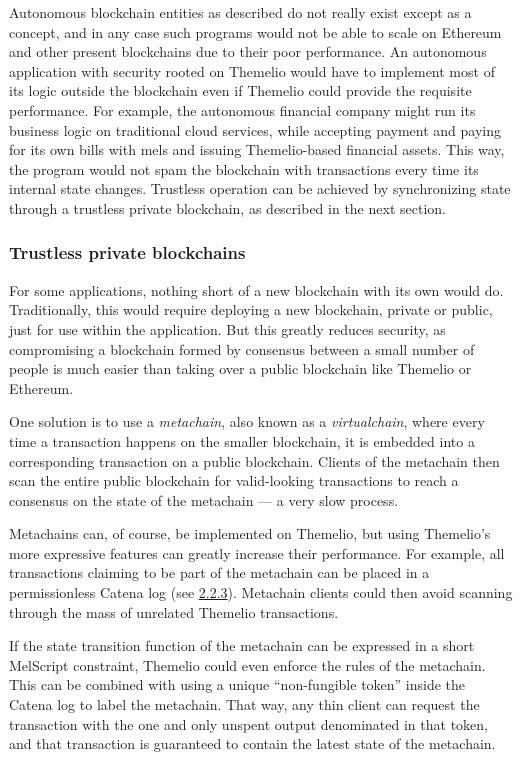 \documentclass[]{article}
\begin{document}
Autonomous blockchain entities as described do not really exist except
as a concept, and in any case such programs would not be able to scale
on Ethereum and other present blockchains due to their poor performance.
An autonomous application with security rooted on Themelio would have to
implement most of its logic outside the blockchain even if Themelio
could provide the requisite performance. For example, the autonomous
financial company might run its business logic on traditional cloud
services, while accepting payment and paying for its own bills with mels
and issuing Themelio-based financial assets. This way, the program would
not spam the blockchain with transactions every time its internal state
changes. Trustless operation can be achieved by synchronizing state
through a trustless private blockchain, as described in the next
section.

\hypertarget{trustless-private-blockchains}{%
\subsubsection{Trustless private
blockchains}\label{trustless-private-blockchains}}

For some applications, nothing short of a new blockchain with its own
would do. Traditionally, this would require deploying a new blockchain,
private or public, just for use within the application. But this greatly
reduces security, as compromising a blockchain formed by consensus
between a small number of people is much easier than taking over a
public blockchain like Themelio or Ethereum.

One solution is to use a \emph{metachain}, also known as a
\emph{virtualchain}, where every time a transaction happens on the
smaller blockchain, it is embedded into a corresponding transaction on a
public blockchain. Clients of the metachain then scan the entire public
blockchain for valid-looking transactions to reach a consensus on the
state of the metachain --- a very slow process.

Metachains can, of course, be implemented on Themelio, but using
Themelio's more expressive features can greatly increase their
performance. For example, all transactions claiming to be part of the
metachain can be placed in a permissionless Catena log (see
\href{}{2.2.3}). Metachain clients could then avoid scanning through the
mass of unrelated Themelio transactions.

If the state transition function of the metachain can be expressed in a
short MelScript constraint, Themelio could even enforce the rules of the
metachain. This can be combined with using a unique ``non-fungible
token'' inside the Catena log to label the metachain. That way, any thin
client can request the transaction with the one and only unspent output
denominated in that token, and that transaction is guaranteed to contain
the latest state of the metachain.
\end{document}
